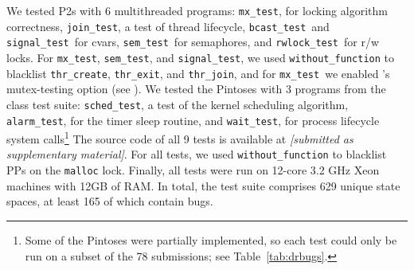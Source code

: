 \newcommand\mxtest{\texttt{mx\_test}}
\newcommand\tej{\texttt{join\_test}}
\newcommand\bct{\texttt{bcast\_test}}
\newcommand\paraguay{\texttt{signal\_test}}
\newcommand\paradise{\texttt{sem\_test}}
\newcommand\rwldgr{\texttt{rwlock\_test}}
We tested P2s with 6 multithreaded programs:
\mxtest, for locking algorithm correctness,
\tej, a test of thread lifecycle,
\bct~and \paraguay~for cvars,
\paradise~for semaphores,
and \rwldgr~for r/w locks.
For \mxtest, \paradise, and \paraguay, we used {\tt without\_function} to blacklist {\tt thr\_create}, {\tt thr\_exit}, and {\tt thr\_join},
and for \mxtest~we enabled \landslide's mutex-testing option
(see \sect{\ref{sec:landslide}}).
\newcommand\prisema{\texttt{sched\_test}}
\newcommand\waitsimple{\texttt{wait\_test}}
\newcommand\alarmsimul{\texttt{alarm\_test}}
We tested the Pintoses with 3 programs from the class test suite: \prisema, a test of the kernel scheduling algorithm,
\alarmsimul, for the timer sleep routine,
and \waitsimple, for process lifecycle system calls\footnote{
	Some of the Pintoses were partially implemented, so each test could only be run on a subset of the 78 submissions; see Table~\ref{tab:drbugs}.
}
The source code of all 9 tests is available at
{\em [submitted as supplementary material]}.
For all tests, we used {\tt without\_function} to blacklist PPs on the {\tt malloc} lock.
Finally, all tests were run on 12-core 3.2 GHz Xeon machines with 12GB of RAM.
In total, the test suite comprises 629 unique state spaces,
at least 165 of which contain bugs.

